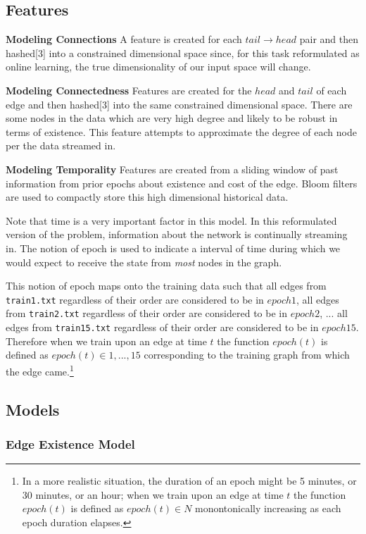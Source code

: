 \documentclass{article} %
\begin{document}
\subsection{Features}

\textbf{Modeling Connections} A feature is created for each $tail
\rightarrow head$ pair and then hashed[3] into a constrained dimensional
space since, for this task reformulated as online learning, the true
dimensionality of our input space will change.

\textbf{Modeling Connectedness} Features are created for the $head$ and
$tail$ of each edge and then hashed[3] into the same constrained dimensional
space.  There are some nodes in the data which are very high degree and
likely to be robust in terms of existence.  This feature attempts to
approximate the degree of each node per the data streamed in.

\textbf{Modeling Temporality} Features are created from a sliding window of
past information from prior epochs about existence and cost of the edge.
Bloom filters are used to compactly store this high dimensional historical
data.

Note that time is a very important factor in this model.  In this
reformulated version of the problem, information about
the network is continually streaming in.  The notion of epoch is used to
indicate a interval of time during which we would expect to receive the
state from \emph{most} nodes in the graph.

This notion of epoch maps onto the training data such that all edges from
\texttt{train1.txt} regardless of their order are considered to be in $epoch
1$, all edges from \texttt{train2.txt} regardless of their order are
considered to be in $epoch 2$, ... all edges from \texttt{train15.txt}
regardless of their order are considered to be in $epoch 15$.  Therefore
when we train upon an edge at time $t$ the function $epoch(t)$ is defined as
$epoch(t) \in {1, ..., 15}$ corresponding to the training graph from which
the edge came.\footnote{In a more realistic situation, the duration of an
  epoch might be 5 minutes, or 30 minutes, or an hour; when we train upon an
  edge at time $t$ the function $epoch(t)$ is defined as $epoch(t) \in N$
  monontonically increasing as each epoch duration elapses.}


\subsection{Models}

\subsubsection{Edge Existence Model}
\end{document}

